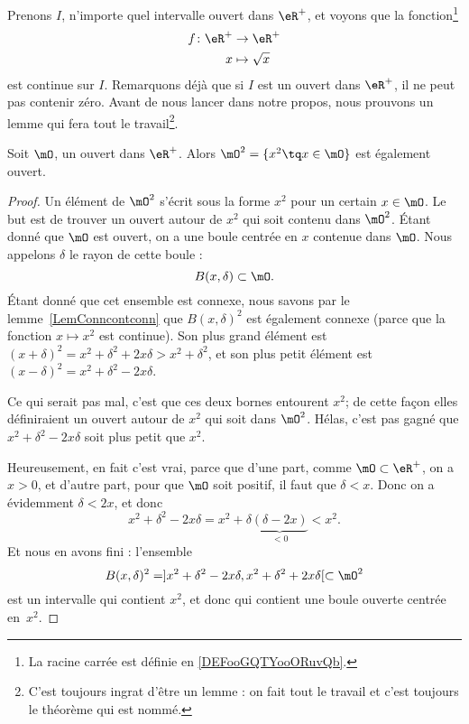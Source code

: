 Prenons \( I\), n'importe quel intervalle ouvert dans \( \eR^+\), et voyons que la fonction\footnote{La racine carrée est définie en \ref{DEFooGQTYooORuvQb}.}
\begin{equation}
	\begin{aligned}
		f\colon \eR^+ & \to \eR^+        \\
		x             & \mapsto \sqrt{x}
	\end{aligned}
\end{equation}
est continue sur \( I\). Remarquons déjà que si \( I\) est un ouvert dans \( \eR^+\), il ne peut pas contenir zéro. Avant de nous lancer dans notre propos, nous prouvons un lemme qui fera tout le travail\footnote{C'est toujours ingrat d'être un lemme : on fait tout le travail et c'est toujours le théorème qui est nommé.}.

\begin{lemma}
	Soit \( \mO\), un ouvert dans \( \eR^+\). Alors \( \mO^2=\{ x^2\tq x\in\mO \}\) est également ouvert.
\end{lemma}

\begin{proof}
	Un élément de \( \mO^2\) s'écrit sous la forme \( x^2\) pour un certain \( x\in\mO\). Le but est de trouver un ouvert autour de \( x^2\) qui soit contenu dans \( \mO^2\). Étant donné que \( \mO\) est ouvert, on a une boule centrée en \( x\) contenue dans \( \mO\). Nous appelons \( \delta\) le rayon de cette boule :
	\[
		B(x,\delta)\subset\mO.
	\]
	Étant donné que cet ensemble est connexe, nous savons par le lemme~\ref{LemConncontconn} que \( B(x,\delta)^2\) est également connexe (parce que la fonction \( x\mapsto x^2\) est continue). Son plus grand élément est \( (x+\delta)^2=x^2+\delta^2+2x\delta>x^2+\delta^2\), et son plus petit élément est \( (x-\delta)^2=x^2+\delta^2-2x\delta\).

	Ce qui serait pas mal, c'est que ces deux bornes entourent \( x^2\); de cette façon elles définiraient un ouvert autour de \( x^2\) qui soit dans \( \mO^2\). Hélas, c'est pas gagné que \( x^2+\delta^2-2x\delta\) soit plus petit que \( x^2\).

	Heureusement, en fait c'est vrai, parce que d'une part, comme \( \mO\subset\eR^+\), on a \( x>0\), et d'autre part, pour que \( \mO\) soit positif, il faut que \( \delta<x\). Donc on a évidemment \( \delta<2x\), et donc
	\[
		x^2+\delta^2-2x\delta=x^2+\delta\underbrace{(\delta-2x)}_{<0}<x^2.
	\]
	Et nous en avons fini : l'ensemble
	\[
		B(x,\delta)^2=]x^2+\delta^2-2x\delta,x^2+\delta^2+2x\delta[\subset\mO^2
	\]
	est un intervalle qui contient \( x^2\), et donc qui contient une boule ouverte centrée en~\( x^2\).
\end{proof}

